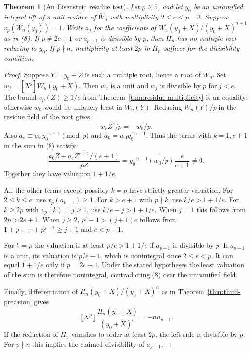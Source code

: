 \documentclass[11pt]{article}
\newtheorem{theorem}{Theorem}\newtheorem{lemma}[theorem]{Lemma}
\begin{document}
\begin{theorem}[An Eisenstein residue test]\label{thm:eisenstein}
Let $p\ge5$, and let $y_0$ be an unramified integral lift of a unit
residue of $\bar W_n$ with multiplicity $2\le e\le p-3$.
Suppose $v_p(W_n(y_0))=1$. Write $a_j$ for the coefficients of
$W_n(y_0+X)/(y_0+X)^{n+1}$ as in \textup{(8)}.
If $p\ne 2e+1$ or $a_{p-1}$ is divisible by $p$, then $H_n$ has
no multiple root reducing to $\bar y_0$.
If $p\nmid n$, multiplicity at least $2p$ in $\bar H_n$ suffices
for the divisibility condition.
\end{theorem}
\begin{proof}
Suppose $Y=y_0+Z$ is such a multiple root, hence a root of $W_n$.
Set $w_j=[X^j]W_n(y_0+X)$. Then $w_e$ is a unit and
$w_j$ is divisible by $p$ for $j<e$. The bound $v_p(Z)\ge 1/e$
from Theorem~\ref{thm:residue-multiplicity} is an equality:
otherwise $w_0$ would be uniquely least in $W_n(Y)$.
Reducing $W_n(Y)/p$ in the residue field of the root gives
\[
       \overline{w_e Z^e/p}=-\overline{w_0/p}.
\]
Also $a_e\equiv w_e y_0^{-n-1}\pmod p$ and
$a_0=w_0y_0^{-n-1}$. Thus the terms with $k=1,e+1$ in the
sum in \textup{(8)} satisfy
\[
 \overline{\frac{a_0Z+a_eZ^{e+1}/(e+1)}{pZ}}
    =\overline{y_0^{-n-1}(w_0/p)\frac{e}{e+1}}\ne0.
\]
Together they have valuation $1+1/e$.

All the other terms except possibly $k=p$ have strictly greater
valuation. For $2\le k\le e$, use $v_p(a_{k-1})\ge1$.
For $k>e+1$ with $p\nmid k$, use $k/e>1+1/e$.
For $k\ge 2p$ with $v_p(k)=j\ge1$, use
$k/e-j>1+1/e$. When $j=1$ this follows from $2p>2e+1$.
When $j\ge2$, $p^j-1>(j+1)e$ follows from
$1+p+\cdots+p^{j-1}\ge j+1$ and $e<p-1$.

For $k=p$ the valuation is at least $p/e>1+1/e$ if $a_{p-1}$
is divisible by $p$. If $a_{p-1}$ is a unit, its valuation
is $p/e-1$, which is nonintegral since $2\le e<p$.
It can equal $1+1/e$ only if $p=2e+1$.
Under the stated hypotheses the least valuation of the sum
is therefore nonintegral, contradicting \textup{(8)} over
the unramified field.

Finally, differentiation of $H_n(y_0+X)/(y_0+X)^n$ as in
Theorem~\ref{thm:third-precision} gives
\[
 [X^p]\frac{H_n(y_0+X)}{(y_0+X)^n}=-n a_{p-1}.
\]
If the reduction of $H_n$ vanishes to order at least $2p$,
the left side is divisible by $p$. For $p\nmid n$ this
implies the claimed divisibility of $a_{p-1}$.
\end{proof}
\end{document}
